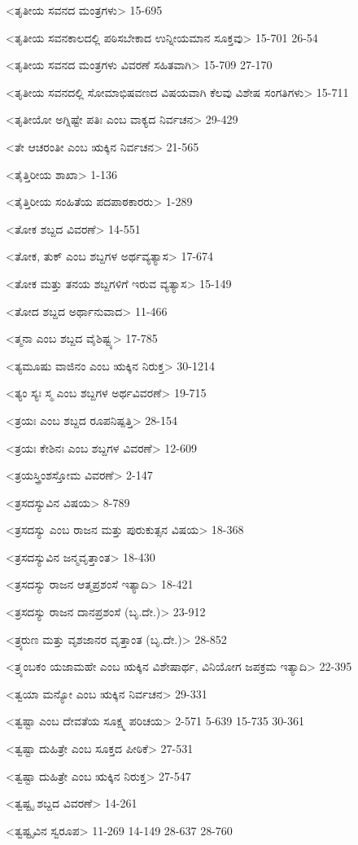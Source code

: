 <ತೃತೀಯ ಸವನದ ಮಂತ್ರಗಳು>
15-695

<ತೃತೀಯ ಸವನಕಾಲದಲ್ಲಿ ಪಠಿಸಬೇಕಾದ ಉನ್ನೀಯಮಾನ ಸೂಕ್ತವು>
15-701
26-54

<ತೃತೀಯ ಸವನದ ಮಂತ್ರಗಳು ವಿವರಣೆ ಸಹಿತವಾಗಿ>
15-709
27-170

<ತೃತೀಯ ಸವನದಲ್ಲಿ ಸೋಮಾಭಿಷವಣದ ವಿಷಯವಾಗಿ ಕೆಲವು ವಿಶೇಷ ಸಂಗತಿಗಳು>
15-711

<ತೃತೀಯೋ ಅಗ್ನಿಷ್ಟೇ ಪತಿಃ ಎಂಬ ವಾಕ್ಯದ ನಿರ್ವಚನ>
29-429

<ತೇ ಆಚರಂತೀ ಎಂಬ ಋಕ್ಕಿನ ನಿರ್ವಚನ>
21-565

<ತೈತ್ತಿರೀಯ ಶಾಖಾ>
1-136

<ತೈತ್ತಿರೀಯ ಸಂಹಿತೆಯ ಪದಪಾಠಕಾರರು>
1-289

<ತೋಕ ಶಬ್ದದ ವಿವರಣೆ>
14-551

<ತೋಕ, ತುಕ್‍ ಎಂಬ ಶಬ್ದಗಳ ಅರ್ಥವ್ಯತ್ಯಾಸ>
17-674

<ತೋಕ ಮತ್ತು ತನಯ ಶಬ್ದಗಳಿಗೆ ಇರುವ ವ್ಯತ್ಯಾಸ>
15-149

<ತೋದ ಶಬ್ದದ ಅರ್ಥಾನುವಾದ>
11-466

<ತ್ಮನಾ ಎಂಬ ಶಬ್ದದ ವೈಶಿಷ್ಟ್ಯ>
17-785

<ತ್ಯಮೂಷು ವಾಜಿನಂ ಎಂಬ ಋಕ್ಕಿನ ನಿರುಕ್ತ>
30-1214

<ತ್ಯಂ ಸ್ಯಃ ಸ್ಮ ಎಂಬ ಶಬ್ದಗಳ ಅರ್ಥವಿವರಣೆ>
19-715

<ತ್ರಯಃ ಎಂಬ ಶಬ್ದದ ರೂಪನಿಷ್ಪತ್ತಿ>
28-154

<ತ್ರಯಃ ಕೇಶಿನಃ ಎಂಬ ಶಬ್ದಗಳ ವಿವರಣೆ>
12-609

<ತ್ರಯಸ್ತ್ರಿಂಶಸ್ತೋಮ ವಿವರಣೆ>
2-147

<ತ್ರಸದಸ್ಯುವಿನ ವಿಷಯ>
8-789

<ತ್ರಸದಸ್ಯು ಎಂಬ ರಾಜನ ಮತ್ತು ಪುರುಕುತ್ಸನ ವಿಷಯ>
18-368

<ತ್ರಸದಸ್ಯುವಿನ ಜನ್ಮವೃತ್ತಾಂತ>
18-430

<ತ್ರಸದಸ್ಯು ರಾಜನ ಆತ್ಮಪ್ರಶಂಸೆ ಇತ್ಯಾದಿ>
18-421

<ತ್ರಸದಸ್ಯು ರಾಜನ ದಾನಪ್ರಶಂಸೆ (ಬೃ.ದೇ.)>
23-912

<ತ್ರ್ಯರುಣ ಮತ್ತು ವೃಶಜಾನರ ವೃತ್ತಾಂತ (ಬೃ.ದೇ.)>
28-852

<ತ್ರ್ಯಂಬಕಂ ಯಜಾಮಹೇ ಎಂಬ ಋಕ್ಕಿನ ವಿಶೇಷಾರ್ಥ, ವಿನಿಯೋಗ ಜಪಕ್ರಮ ಇತ್ಯಾದಿ>
22-395

<ತ್ವಯಾ ಮನ್ಯೋ ಎಂಬ ಋಕ್ಕಿನ ನಿರ್ವಚನ>
29-331

<ತ್ವಷ್ಟಾ ಎಂಬ ದೇವತೆಯ ಸೂಕ್ಷ್ಮ ಪರಿಚಯ>
2-571 
5-639 
15-735
30-361

<ತ್ವಷ್ಟಾ ದುಹಿತ್ರೇ ಎಂಬ ಸೂಕ್ತದ ಪೀಠಿಕೆ>
27-531

<ತ್ವಷ್ಟಾ ದುಹಿತ್ರೇ ಎಂಬ ಋಕ್ಕಿನ ನಿರುಕ್ತ>
27-547

<ತ್ವಷ್ಟೃ ಶಬ್ದದ ವಿವರಣೆ>
14-261

<ತ್ವಷ್ಟೃವಿನ ಸ್ವರೂಪ>
11-269 
14-149 
28-637
28-760

